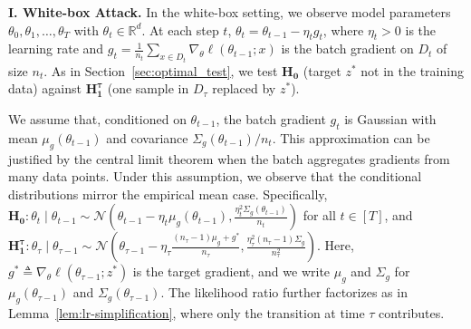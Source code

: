 \documentclass{article}
\theoremstyle{plain}
\theoremstyle{definition}
\theoremstyle{remark}
\newcommand{\RR}{\ensuremath{\mathbb{R}}}
\newcommand{\cN}{\ensuremath{\mathcal{N}}}
\begin{document}
\textbf{I. White-box Attack.} In the white-box setting, we observe model parameters $\theta_0, \theta_1, \ldots, \theta_T$ with $\theta_t \in \RR^d$. At each step $t$, $\theta_t = \theta_{t-1} - \eta_t g_t$, where $\eta_t > 0$ is the learning rate and $g_t = \frac{1}{n_t}\sum_{x \in D_t} \nabla_\theta \ell(\theta_{t-1}; x)$ is the batch gradient on $D_t$ of size $n_t$. As in Section~\ref{sec:optimal_test}, we test $\mathbf{H_0}$ (target $z^*$ not in the training data) against $\mathbf{H_1^\tau}$ (one sample in $D_\tau$ replaced by $z^*$).


We assume that, conditioned on $\theta_{t-1}$, the batch gradient $g_t$ is Gaussian with mean $\mu_g(\theta_{t-1})$ and covariance $\Sigma_g(\theta_{t-1})/n_t$. This approximation can be justified by the central limit theorem when the batch aggregates gradients from many data points.
Under this assumption, we observe that the conditional distributions mirror the empirical mean case. Specifically,
$ \mathbf{H_0}:    \theta_t \mid \theta_{t-1}  \sim \cN\left(\theta_{t-1} - \eta_t \mu_g(\theta_{t-1}), \frac{\eta_t^2 \Sigma_g(\theta_{t-1})}{n_t}\right)$ for all $t\in [T]$, and $\mathbf{H_1^\tau}: \theta_\tau \mid \theta_{\tau-1}\sim \cN\left(\theta_{\tau-1} - \eta_\tau \frac{(n_\tau-1)\mu_g + g^*}{n_\tau}, \frac{\eta_\tau^2(n_\tau-1)\Sigma_g}{n_\tau^2}\right)$.
Here, $g^* \triangleq \nabla_\theta \ell(\theta_{\tau-1}; z^*)$ is the target gradient, and we write $\mu_g$ and $\Sigma_g$ for $\mu_g(\theta_{\tau-1})$ and $\Sigma_g(\theta_{\tau-1})$.
The likelihood ratio further factorizes as in Lemma~\ref{lem:lr-simplification}, where only the transition at time $\tau$ contributes.
\end{document}
